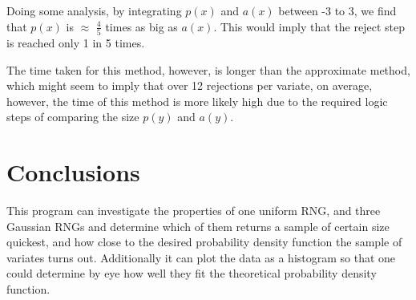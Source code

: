 \documentclass{article}
\begin{document}
\begin{figure}[htb]
\end{figure}

Doing some analysis, by integrating $p(x)$ and $a(x)$ between -3 to 3, we find that $p(x)$ is $\approx$ $\frac{4}{5}$ times as big as $a(x)$. This would imply that the reject step is reached only 1 in 5 times.

The time taken for this method, however, is longer than the approximate method, which might seem to imply that over 12 rejections per variate, on average, however, the time of this method is more likely high due to the required logic steps of comparing the size $p(y)$ and $a(y)$.

\begin{figure}[htb]
\end{figure}





\section{Conclusions}

This program can investigate the properties of one uniform RNG, and three Gaussian RNGs and determine which of them returns a sample of certain size quickest, and how close to the desired probability density function the sample of variates turns out. Additionally it can plot the data as a histogram so that one could determine by eye how well they fit the theoretical probability density function.
\end{document}
